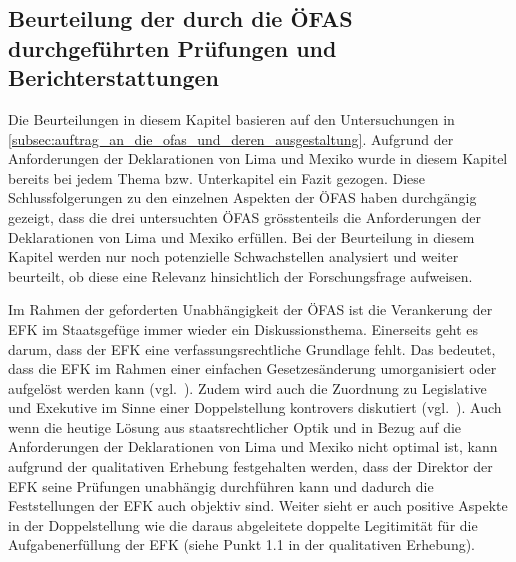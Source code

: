 \documentclass[10pt]{article}
\begin{document}
\subsection{Beurteilung der durch die ÖFAS durchgeführten Prüfungen und Berichterstattungen}\label{subsec:beurteilung_der_durch_die_ofas_durchgefuehrten_pruefungen_und_berichterstattungen}
Die Beurteilungen in diesem Kapitel basieren auf den Untersuchungen in \vref{subsec:auftrag_an_die_ofas_und_deren_ausgestaltung}. Aufgrund der Anforderungen der Deklarationen von Lima und Mexiko wurde in diesem Kapitel bereits bei jedem Thema bzw. Unterkapitel ein Fazit gezogen. Diese Schlussfolgerungen zu den einzelnen Aspekten der ÖFAS haben durchgängig gezeigt, dass die drei untersuchten ÖFAS grösstenteils die Anforderungen der Deklarationen von Lima und Mexiko erfüllen. Bei der Beurteilung in diesem Kapitel werden nur noch potenzielle Schwachstellen analysiert und weiter beurteilt, ob diese eine Relevanz hinsichtlich der Forschungsfrage aufweisen.

Im Rahmen der geforderten Unabhängigkeit der ÖFAS ist die Verankerung der EFK im Staatsgefüge immer wieder ein Diskussionsthema. Einerseits geht es darum, dass der EFK eine verfassungsrechtliche Grundlage fehlt. Das bedeutet, dass die EFK im Rahmen einer einfachen Gesetzesänderung umorganisiert oder aufgelöst werden kann (vgl.~\cite[414]{Koller2002}). Zudem wird auch die Zuordnung zu Legislative und Exekutive im Sinne einer Doppelstellung kontrovers diskutiert (vgl.~\cite[386]{Koller2002}). Auch wenn die heutige Lösung aus staatsrechtlicher Optik und in Bezug auf die Anforderungen der Deklarationen von Lima und Mexiko nicht optimal ist, kann aufgrund der qualitativen Erhebung festgehalten werden, dass der Direktor der EFK seine Prüfungen unabhängig durchführen kann und dadurch die Feststellungen der EFK auch objektiv sind. Weiter sieht er auch positive Aspekte in der Doppelstellung wie die daraus abgeleitete doppelte Legitimität für die Aufgabenerfüllung der EFK (siehe Punkt 1.1 in der qualitativen Erhebung).
\end{document}
